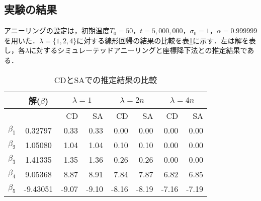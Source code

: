 \documentclass[technicalreport]{ieicej}
\begin{document}
\subsection{実験の結果}
アニーリングの設定は，初期温度$T_{0}=50$，$t=5,000,000$，$\sigma_{0}=1$，$\alpha=0.999999$を用いた．$\lambda =\{1,2,4\}$に対する線形回帰の結果の比較を表\ref{table:result}に示す．左は解を表し，各$\lambda$に対するシミュレーテッドアニーリングと座標降下法との推定結果である．
\begin{table}[b]
  \begin{center}
    \caption{CDとSAでの推定結果の比較}
    \label{table:result}
    \begin{tabular}{|c||c|r|r|r|r|r|r|} \hline
      & 解($\beta$) & \multicolumn{2}{|c|}{$\lambda =1$} & \multicolumn{2}{|c|}{$\lambda =2n$} & \multicolumn{2}{|c|}{$\lambda =4n$} \\ \hline \hline
      & & CD & SA & CD & SA & CD & SA  \\ \hline
      $\beta_{1}$ &  0.32797 &  0.33 &  0.33 &  0.00 &  0.00 &  0.00 &  0.00 \\
      $\beta_{2}$ &  1.05080 &  1.04 &  1.04 &  0.10 &  0.10 &  0.00 &  0.00 \\
      $\beta_{3}$ &  1.41335 &  1.35 &  1.36 &  0.26 &  0.26 &  0.00 &  0.00 \\
      $\beta_{4}$ &  9.05368 &  8.87 &  8.91 &  7.84 &  7.87 &  6.82 &  6.85 \\
      $\beta_{5}$ & -9.43051 & -9.07 & -9.10 & -8.16 & -8.19 & -7.16 & -7.19 \\ \hline
    \end{tabular}
  \end{center}
\end{table}
  
\end{document}
